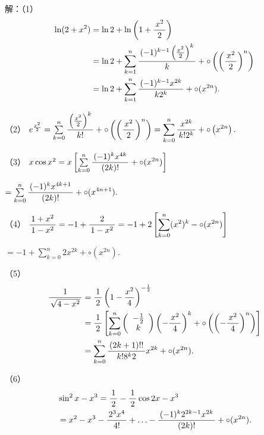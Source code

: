 \begin{frame}
	\linespread{1.5}
	\pause
	
	\bigskip
	
	\small 解：（1）
	\begin{align*}
		\ln(2+x^2)&=\ln2+\ln\left(1+\displaystyle\frac{\,{x^2}\,}{\,{2}\,}\right)\\
		&=\ln2+\sum\limits_{k=1}^n\displaystyle\frac{\,{(-1)^{k-1}\left(\frac{x^2}{2}\right)^k}\,}{\,{k}\,}
		+\circ\left(\left(\displaystyle\frac{\,{x^2}\,}{\,{2}\,}\right)^n\right)\\
		&=\ln2+\sum\limits_{k=1}^n\displaystyle\frac{\,{(-1)^{k-1}x^{2k}}\,}{\,{k2^k}\,}
		+\circ(x^{2n}).
	\end{align*}
\end{frame}

\begin{frame}
	\linespread{1.5}
	
	
	\small （2）
	$
		e^{\frac{x^2}2}
		=\sum\limits_{k=0}^n\displaystyle\frac{\,{\left(\frac{x^2}2\right)^k}\,}{\,{k!}\,}
		+\circ\left(\left(\displaystyle\frac{\,{x^2}\,}{\,{2}\,}\right)^n\right)
		=\sum\limits_{k=0}^n\displaystyle\frac{\,{x^{2k}}\,}{\,{k!2^k}\,}
		+\circ\left(x^{2n}\right).
	$
	\bigskip
	
	\pause
	（3）
	$
		x\cos x^2
		=x\left[\sum\limits_{k=0}^n\displaystyle\frac{\,{(-1)^kx^{4k}}\,}{\,{(2k)!}\,}
		+\circ(x^{2n})\right]$
		
		\quad $
		=\sum\limits_{k=0}^n\displaystyle\frac{\,{(-1)^kx^{4k+1}}\,}{\,{(2k)!}\,}
		+\circ(x^{4n+1}).
	$
	\bigskip
	
	\pause
	（4）
	$
		\displaystyle\frac{\,{1+x^2}\,}{\,{1-x^2}\,}
		=-1+\displaystyle\frac{\,{2}\,}{\,{1-x^2}\,}
		=-1+2\left[\sum\limits_{k=0}^n(x^2)^k-\circ(x^{2n})\right]$
		
		\quad$
		=-1+\sum\limits_{k=0}^n2x^{2k}+\circ(x^{2n}).
	$
\end{frame}

\begin{frame}
	\linespread{1.5}
	
	
	\small （5）
	\begin{align*}
		\displaystyle\frac{\,{1}\,}{\,{\sqrt{4-x^2}}\,}
		&=\displaystyle\frac{\,{1}\,}{\,{2}\,}\left(1-\frac{x^2}4\right)^{-\frac12}\\
		&=\displaystyle\frac{\,{1}\,}{\,{2}\,}\left[\sum\limits_{k=0}^n\left(\begin{array}{c}
			-\frac12 \\ k
		\end{array}\right)\left(-\displaystyle\frac{\,{x^2}\,}{\,{4}\,}\right)^k
		+\circ\left(\left(-\displaystyle\frac{\,{x^2}\,}{\,{4}\,}\right)^n\right)
		\right]\\
		&=\sum\limits_{k=0}^n\displaystyle\frac{\,{(2k+1)!!}\,}{\,{k!8^k2}\,}x^{2k}
		+\circ(x^{2n}).
	\end{align*}
	
	\pause
	（6）
	\begin{align*}
		&\sin^2x-x^3=\displaystyle\frac{\,{1}\,}{\,{2}\,}-\displaystyle\frac{\,{1}\,}{\,{2}\,}\cos2x-x^3\\
		&=x^2-x^3-\displaystyle\frac{\,{2^3x^4}\,}{\,{4!}\,}
		+\ldots-\displaystyle\frac{\,{(-1)^k2^{2k-1}x^{2k}}\,}{\,{(2k)!}\,}+\circ(x^{2n}).
	\end{align*}
\end{frame}

